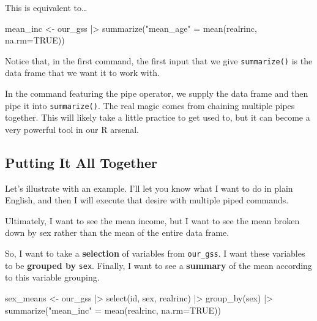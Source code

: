 \documentclass[
  letterpaper,
  DIV=11,
  numbers=noendperiod]{scrreprt}
\newenvironment{Shaded}{\begin{snugshade}}{\end{snugshade}}
\newcommand{\AttributeTok}[1]{\textcolor[rgb]{0.40,0.45,0.13}{#1}}
\newcommand{\ConstantTok}[1]{\textcolor[rgb]{0.56,0.35,0.01}{#1}}
\newcommand{\FunctionTok}[1]{\textcolor[rgb]{0.28,0.35,0.67}{#1}}
\newcommand{\NormalTok}[1]{\textcolor[rgb]{0.00,0.23,0.31}{#1}}
\newcommand{\OtherTok}[1]{\textcolor[rgb]{0.00,0.23,0.31}{#1}}
\newcommand{\SpecialCharTok}[1]{\textcolor[rgb]{0.37,0.37,0.37}{#1}}
\newcommand{\StringTok}[1]{\textcolor[rgb]{0.13,0.47,0.30}{#1}}
\begin{document}
This is equivalent to\ldots{}

\begin{Shaded}
\begin{Highlighting}[]
\NormalTok{mean\_inc }\OtherTok{\textless{}{-}}\NormalTok{ our\_gss }\SpecialCharTok{|\textgreater{}}
  \FunctionTok{summarize}\NormalTok{(}\StringTok{"mean\_age"} \OtherTok{=} \FunctionTok{mean}\NormalTok{(realrinc, }\AttributeTok{na.rm=}\ConstantTok{TRUE}\NormalTok{))}
\end{Highlighting}
\end{Shaded}

Notice that, in the first command, the first input that we give
\texttt{summarize()} is the data frame that we want it to work with.

In the command featuring the pipe operator, we supply the data frame and
then pipe it into \texttt{summarize()}. The real magic comes from
chaining multiple pipes together. This will likely take a little
practice to get used to, but it can become a very powerful tool in our R
arsenal.

\subsection{Putting It All Together}\label{putting-it-all-together}

Let's illustrate with an example. I'll let you know what I want to do in
plain English, and then I will execute that desire with multiple piped
commands.

Ultimately, I want to see the mean income, but I want to see the mean
broken down by sex rather than the mean of the entire data frame.

So, I want to take a \textbf{selection} of variables from
\texttt{our\_gss}. I want these variables to be \textbf{grouped by}
\texttt{sex}. Finally, I want to see a \textbf{summary} of the mean
according to this variable grouping.

\begin{Shaded}
\begin{Highlighting}[]
\NormalTok{sex\_means }\OtherTok{\textless{}{-}}\NormalTok{ our\_gss }\SpecialCharTok{|\textgreater{}}
  \FunctionTok{select}\NormalTok{(id, sex, realrinc) }\SpecialCharTok{|\textgreater{}}
  \FunctionTok{group\_by}\NormalTok{(sex) }\SpecialCharTok{|\textgreater{}}
  \FunctionTok{summarize}\NormalTok{(}\StringTok{"mean\_inc"} \OtherTok{=} \FunctionTok{mean}\NormalTok{(realrinc, }\AttributeTok{na.rm=}\ConstantTok{TRUE}\NormalTok{))}
\end{Highlighting}
\end{Shaded}
\end{document}
